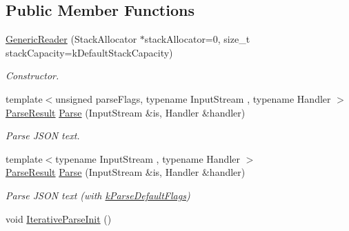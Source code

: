 \subsection*{Public Member Functions}
\begin{DoxyCompactItemize}
\item 
\hyperlink{classGenericReader_aab875a34b3092df9fb4e2b8eac6dbb96}{Generic\+Reader} (Stack\+Allocator $\ast$stack\+Allocator=0, size\+\_\+t stack\+Capacity=k\+Default\+Stack\+Capacity)
\begin{DoxyCompactList}\small\item\em Constructor. \end{DoxyCompactList}\item 
{\footnotesize template$<$unsigned parse\+Flags, typename Input\+Stream , typename Handler $>$ }\\\hyperlink{structParseResult}{Parse\+Result} \hyperlink{classGenericReader_a0c450620d14ff1824e58bb7bd9b42099}{Parse} (Input\+Stream \&is, Handler \&handler)
\begin{DoxyCompactList}\small\item\em Parse J\+S\+ON text. \end{DoxyCompactList}\item 
{\footnotesize template$<$typename Input\+Stream , typename Handler $>$ }\\\hyperlink{structParseResult}{Parse\+Result} \hyperlink{classGenericReader_a76d91e5fd8dfe48aea7dd6d8a51dd6dc}{Parse} (Input\+Stream \&is, Handler \&handler)
\begin{DoxyCompactList}\small\item\em Parse J\+S\+ON text (with \hyperlink{reader_8h_ab7be7dabe6ffcba60fad441505583450a9104b0946d648e9467cb7a967401ec80}{k\+Parse\+Default\+Flags}) \end{DoxyCompactList}\item 
void \hyperlink{classGenericReader_a7de472eda2ad9de13cfd8c1de74f1754}{Iterative\+Parse\+Init} ()\hypertarget{classGenericReader_a7de472eda2ad9de13cfd8c1de74f1754}{}\label{classGenericReader_a7de472eda2ad9de13cfd8c1de74f1754}


\end{DoxyCompactItemize}
